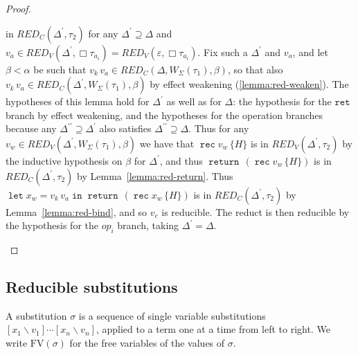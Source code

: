 \documentclass[acmsmall, screen, review, anonymous]{acmart}
\theoremstyle{definition}
\newcommand{\glob}{\mathop{\Box}}
\newcommand{\ind}[1]{W_{#1}}
\newcommand{\retname}{\mathtt{ret}}
\newcommand{\indelimname}{\mathtt{rec}}
\newcommand{\indelim}[2]{\mathop{\indelimname} #1 \,\{#2\}}
\newcommand{\app}[2]{#1\,#2}
\newcommand{\cempty}{\varepsilon}
\newcommand{\returnname}{\mathop{\mathtt{return}}}
\newcommand{\return}[1]{\returnname\, #1}
\newcommand{\letvname}{\mathop{\mathtt{let}}}
\newcommand{\letv}[3]{\letvname #1 = #2 \mathop{\mathtt{in}} #3}
\newcommand{\sub}[2]{[#1\backslash#2]}
\newcommand{\fv}[1]{\mathrm{FV}(#1)}
\newcommand{\redname}{RED}
\newcommand{\redvname}{\redname_{V}}
\newcommand{\redv}[2]{\redvname{({#1},{#2})}}
\newcommand{\redva}[3]{\redvname{({#1},{#2},{#3})}}
\newcommand{\redcname}{\redname_{C}}
\newcommand{\redc}[2]{\redcname{({#1},{#2})}}
\newcommand{\redca}[3]{\redcname{({#1},{#2},{#3})}}
\begin{document}
\begin{proof}
\begin{itemize}
    in $\redc{\Delta^{\prime}}{\tau_2}$ for any
    $\Delta^{\prime} \supseteq \Delta$ and
    $v_a \in \redv{\Delta^{\prime}}{\glob \tau_{a_i}} =
    \redv{\cempty}{\glob \tau_{a_i}}$. Fix such a $\Delta^{\prime}$
    and $v_a$, and let $\beta < \alpha$ be such that
    $\app{v_k}{v_a} \in \redca{\Delta}{\ind{\Sigma}(\tau_1)}{\beta}$,
    so that also
    $\app{v_k}{v_a} \in \redca{\Delta^{\prime}}{\ind{\Sigma}(\tau_1)}{\beta}$
    by effect weakening (\ref{lemma:red-weaken}). The hypotheses of
    this lemma hold for $\Delta^{\prime}$ as well as for $\Delta$: the
    hypothesis for the $\retname$ branch by effect weakening, and the
    hypotheses for the operation branches because any
    $\Delta^{\prime\prime} \supseteq \Delta^{\prime}$ also
    satisfies $\Delta^{\prime\prime} \supseteq \Delta$. Thus for any
    $v_w \in \redva{\Delta^{\prime}}{\ind{\Sigma}(\tau_1)}{\beta}$ we
    have that $\indelim{v_w}{H}$ is in $\redv{\Delta^{\prime}}{\tau_2}$
    by the inductive hypothesis on $\beta$ for $\Delta^{\prime}$, and
    thus $\return{(\indelim{v_w}{H})}$ is in
    $\redc{\Delta^{\prime}}{\tau_2}$ by
    Lemma~\ref{lemma:red-return}. Thus
    $\letv{x_w}{\app{v_k}{v_a}}{\return{(\indelim{x_w}{H})}}$ is in
    $\redc{\Delta^{\prime}}{\tau_2}$ by Lemma~\ref{lemma:red-bind},
    and so $v_c$ is reducible. The reduct is then reducible by the
    hypothesis for the $op_i$ branch, taking $\Delta^{\prime} = \Delta$.
  \end{itemize}
\end{proof}

\subsection{Reducible substitutions}

A substitution $\sigma$ is a sequence of single variable substitutions
$\sub{x_1}{v_1} \cdots \sub{x_n}{v_n}$, applied to a term one at a time
from left to right. We write $\fv{\sigma}$ for the free variables of
the values of $\sigma$.
\end{document}
